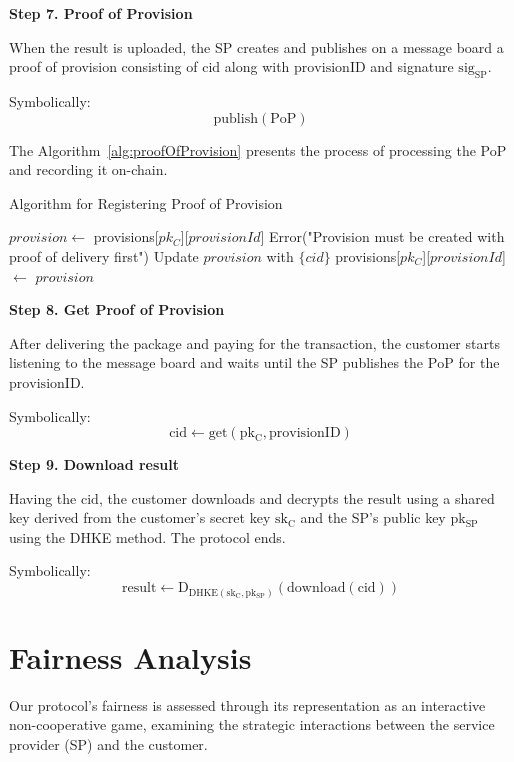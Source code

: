 \documentclass[pdftex,twocolumn,epjc3]{svjour3}
\begin{document}
{\noindent \textbf
{Step 7. Proof of Provision}\label{step-7-proof-of-provision}

When the $\mathrm{result}$ is uploaded, the SP creates and publishes on a message board a proof of provision consisting of $\mathrm{cid}$ along with $\mathrm{provisionID}$ and signature $\mathrm{sig}_\mathrm{SP}$.

Symbolically: 
\[
\mathrm{publish(PoP)}
\]

The Algorithm~\ref{alg:proofOfProvision} presents the process of processing the PoP and recording it on-chain.

\begin{algorithm}
\caption{Algorithm for Registering Proof of Provision}
\label{alg:proofOfProvision}
\begin{algorithmic}[1]
    \State $provision \gets$ provisions[$pk_C$][$provisionId$]
        \State \Return Error("Provision must be created with proof of delivery first")
    \EndIf
    \State Update $provision$ with $\{cid\}$
    \State provisions[$pk_C$][$provisionId$] $\gets$ $provision$
\EndFunction
\end{algorithmic}
\end{algorithm}

\noindent \textbf
{Step 8. Get Proof of Provision}\label{step-8-get-proof-of-provision}

After delivering the package and paying for the transaction, the customer starts listening to the message board and waits until the SP publishes the $\mathrm{PoP}$ for the $\mathrm{provisionID}$.

Symbolically: 
\[
\mathrm{cid \gets get(pk_C, provisionID)}
\]

\noindent \textbf
{Step 9. Download result}\label{step-9-download-result}

Having the $\mathrm{cid}$, the customer downloads and decrypts the $\mathrm{result}$ using a shared key derived from the customer's secret key $\mathrm{sk_C}$ and the SP's public key $\mathrm{pk_{SP}}$ using the DHKE method. The protocol ends.

Symbolically: 
\[
\mathrm{result \gets D_{DHKE(sk_C, pk_{SP})}(download(cid))}
\]

\section{Fairness Analysis}\label{sec:fairness-analysis}
Our protocol's fairness is assessed through its representation as an interactive non-cooperative game, examining the strategic interactions between the service provider (SP) and the customer.


}
\end{document}
